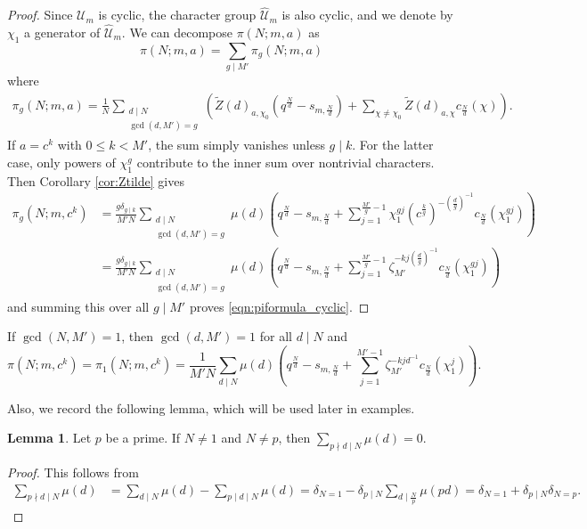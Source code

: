 \documentclass[10pt,reqno]{amsproc}
\newcommand{\what}[1]{\widehat{#1}}
\newcommand{\scU}{\mathscr{U}}
\newcommand{\1}{\mathds{1}}	%
\theoremstyle{definition}
\newtheorem{lemma}[theorem]{Lemma}
\theoremstyle{remark}
\begin{document}
\begin{proof}
Since $\scU_m$ is cyclic, the character group $\what{\scU}_m$ is also cyclic, and we denote by $\chi_1$ a generator of $\what{\scU}_m$.
We can decompose $\pi(N; m, a)$ as
\begin{equation}
\label{eqn:pi_decomp_pig}
    \pi(N; m, a) = \sum_{g \mid M'} \pi_g(N; m, a)
\end{equation}
where
\begin{align}
\label{eqn:pig_def}
    \pi_g(N; m, a) = \frac{1}{N} \sum_{\substack{d \mid N \\ \gcd(d, M') = g}} \left( \widetilde{Z}(d)_{a, \chi_0}(q^{\frac{N}{d}} - s_{m, \frac{N}{d}}) + \sum_{\chi \ne \chi_0} \widetilde{Z}(d)_{a, \chi} c_{\frac{N}{d}}(\chi)\right).
\end{align}
If $a = c^k$ with $0 \le k < M'$, the sum simply vanishes unless $g \mid k$.
For the latter case, only powers of $\chi_1^g$ contribute to the inner sum over nontrivial characters.
Then Corollary \ref{cor:Ztilde} gives
\begin{align}
    \pi_g(N; m, c^k) &= \frac{g \delta_{g \mid k}}{M'N} \sum_{\substack{d \mid N \\ \gcd(d, M') = g}} \mu(d) \left(q^{\frac{N}{d}} - s_{m, \frac{N}{d}} + \sum_{j=1}^{\frac{M'}{g} - 1} \chi_1^{gj}(c^{\frac{k}{g}})^{-\left(\frac{d}{g}\right)^{-1}} c_{\frac{N}{d}}(\chi_1^{gj})\right) \nonumber \\
    &= \frac{g \delta_{g \mid k}}{M'N} \sum_{\substack{d \mid N \\ \gcd(d, M') = g}} \mu(d) \left(q^{\frac{N}{d}} - s_{m, \frac{N}{d}} + \sum_{j=1}^{\frac{M'}{g} - 1} \zeta_{M'}^{-kj\left(\frac{d}{g}\right)^{-1}} c_{\frac{N}{d}}(\chi_1^{gj})\right) \label{eqn:pig_cyclic}
\end{align}
and summing this over all $g \mid M'$ proves \eqref{eqn:piformula_cyclic}.
\end{proof}

If $\gcd(N, M') = 1$, then $\gcd(d, M') = 1$ for all $d \mid N$ and
\begin{equation}
    \label{eqn:pi_coprime_deg}
    \pi(N; m, c^k) = \pi_1(N; m, c^k) = \frac{1}{M'N} \sum_{d \mid N} \mu(d)\left(q^{\frac{N}{d}} - s_{m, \frac{N}{d}} + \sum_{j=1}^{M' - 1} \zeta_{M'}^{-kjd^{-1}} c_{\frac{N}{d}}(\chi_1^{j})\right).
\end{equation}


Also, we record the following lemma, which will be used later in examples.
\begin{lemma}
\label{lem:mobius_sum_pnmid}
    Let $p$ be a prime. If $N \ne 1$ and $N \ne p$, then $\sum_{p \nmid d \mid N} \mu(d) = 0$.
\end{lemma}
\begin{proof}
    This follows from
    \begin{align*}
        \sum_{p \nmid d \mid N} \mu(d) &= \sum_{d \mid N} \mu(d) - \sum_{p \mid d \mid N} \mu(d) = \delta_{N = 1} - \delta_{p \mid N}\sum_{d \mid \frac{N}{p}} \mu(pd) = \delta_{N = 1} + \delta_{p \mid N} \delta_{N = p}.
    \end{align*}
\end{proof}
\end{document}
